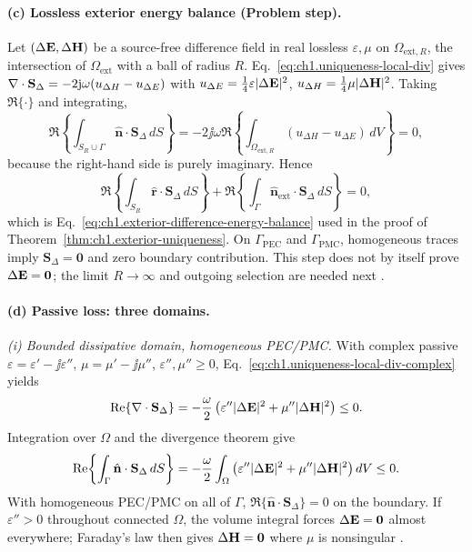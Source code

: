\paragraph{(c) Lossless exterior energy balance (Problem step).}
Let $(\Delta\mathbf{E},\Delta\mathbf{H})$ be a source-free difference field in real lossless $\varepsilon,\mu$ on $\Omega_{\mathrm{ext},R}$, the intersection of $\Omega_{\mathrm{ext}}$ with a ball of radius $R$. Eq.~\eqref{eq:ch1.uniqueness-local-div} gives $\nabla\cdot\mathbf{S}_\Delta=-2\mathrm{j}\omega(u_{\Delta H}-u_{\Delta E})$ with $u_{\Delta E}=\tfrac14\varepsilon|\Delta\mathbf{E}|^2$, $u_{\Delta H}=\tfrac14\mu|\Delta\mathbf{H}|^2$. Taking $\Re\{\cdot\}$ and integrating,
\[
\Re\!\left\{\int_{S_R\cup\Gamma}\hat{\mathbf{n}}\cdot\mathbf{S}_\Delta\,dS\right\}
=-2\jj\omega\Re\!\left\{\int_{\Omega_{\mathrm{ext},R}}(u_{\Delta H}-u_{\Delta E})\,dV\right\}=0,
\]
because the right-hand side is purely imaginary. Hence
\[
\Re\!\left\{\int_{S_R}\hat{\mathbf{r}}\cdot\mathbf{S}_\Delta\,dS\right\}
+\Re\!\left\{\int_{\Gamma}\hat{\mathbf{n}}_{\mathrm{ext}}\cdot\mathbf{S}_\Delta\,dS\right\}=0,
\]
which is Eq.~\eqref{eq:ch1.exterior-difference-energy-balance} used in the proof of Theorem~\ref{thm:ch1.exterior-uniqueness}. On $\Gamma_{\mathrm{PEC}}$ and $\Gamma_{\mathrm{PMC}}$, homogeneous traces imply $\mathbf{S}_\Delta=\mathbf{0}$ and zero boundary contribution. This step does not by itself prove $\Delta\mathbf{E}=\mathbf{0}$; the limit $R\to\infty$ and outgoing selection are needed next \cite{stratton1941}.

\paragraph{(d) Passive loss: three domains.}
\textit{(i) Bounded dissipative domain, homogeneous PEC/PMC.} With complex passive $\varepsilon=\varepsilon'-\jj\varepsilon''$, $\mu=\mu'-\jj\mu''$, $\varepsilon'',\mu''\ge0$, Eq.~\eqref{eq:ch1.uniqueness-local-div-complex} yields
\[
\Re\{\nabla\cdot\mathbf{S}_\Delta\}
=-\frac{\omega}{2}\left(\varepsilon''|\Delta\mathbf{E}|^2+\mu''|\Delta\mathbf{H}|^2\right)\le0.
\]
Integration over $\Omega$ and the divergence theorem give
\[
\Re\!\left\{\int_\Gamma\hat{\mathbf{n}}\cdot\mathbf{S}_\Delta\,dS\right\}
=-\frac{\omega}{2}\int_\Omega\left(\varepsilon''|\Delta\mathbf{E}|^2+\mu''|\Delta\mathbf{H}|^2\right)dV\le0.
\]
With homogeneous PEC/PMC on all of $\Gamma$, $\Re\{\hat{\mathbf{n}}\cdot\mathbf{S}_\Delta\}=0$ on the boundary. If $\varepsilon''>0$ throughout connected $\Omega$, the volume integral forces $\Delta\mathbf{E}=\mathbf{0}$ almost everywhere; Faraday's law then gives $\Delta\mathbf{H}=\mathbf{0}$ where $\mu$ is nonsingular \cite{stratton1941}.

